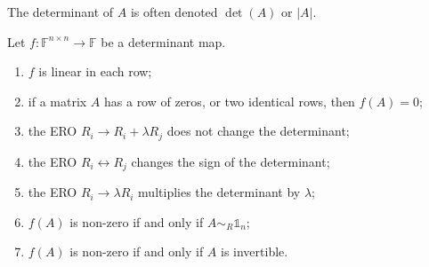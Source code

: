 The determinant of $A$ is often denoted $\det(A)$ or $|A|$.

\begin{lemma} \label{determinantProperties}
Let $f: \mathbb{F}^{n\times n}\to \mathbb{F}$ be a determinant map.
\begin{enumerate}
\item $f$ is linear in each row;
\item if a matrix $A$ has a row of zeros, or two identical rows, then $f(A) = 0$;
\item the ERO $R_i \to R_i+ \lambda R_j$ does not change the determinant;
\item the ERO $R_i \leftrightarrow R_j$ changes the sign of the determinant;
\item the ERO $R_i \to \lambda R_i$ multiplies the determinant by $\lambda$;
\item $f(A)$ is non-zero \textup{if and only if} $A\sim_R \mathbb{1}_n$;
\item $f(A)$ is non-zero \textup{if and only if} $A$ is invertible.
\end{enumerate}
\end{lemma}

